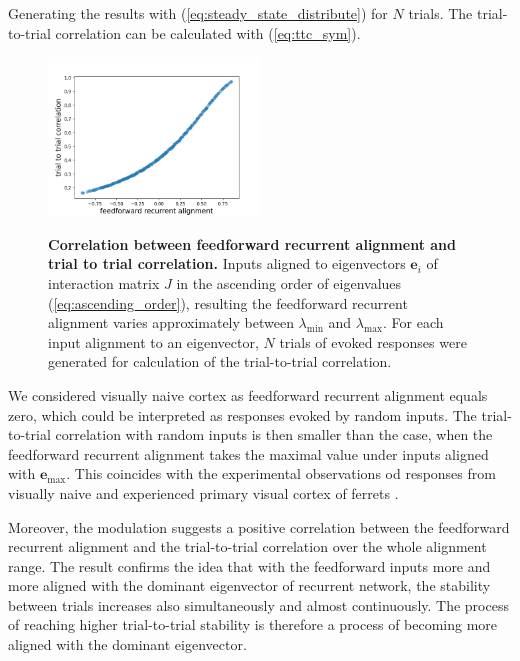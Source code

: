 \documentclass[11pt]{article}
\begin{document}
	Generating the results with (\ref{eq:steady_state_distribute}) for $N$ trials. The trial-to-trial correlation can be calculated with (\ref{eq:ttc_sym}). 
	\vspace{-0.4cm}
		\begin{figure} 
			\centering
			\caption{\textbf{Correlation between feedforward recurrent alignment and trial to trial correlation.} Inputs aligned to eigenvectors $\mathbf{e}_i$ of interaction matrix $J$ in the ascending order of eigenvalues (\ref{eq:ascending_order}), resulting the feedforward recurrent alignment varies approximately between $\lambda_{\text{min}}$ and $\lambda_{\text{max}}$. For each input alignment to an eigenvector, $N$ trials of evoked responses were generated for calculation of the trial-to-trial correlation.}
			\includegraphics[width=0.5\textwidth]{../figures/ttc_sym.png}
			\label{fig:ttc_ffrec_sym}
		\end{figure}
	
	We considered visually naive cortex as feedforward recurrent alignment equals zero, which could be interpreted as responses evoked by random inputs. The trial-to-trial correlation with random inputs is then smaller than the case, when the feedforward recurrent alignment takes the maximal value under inputs aligned with $\mathbf{e}_{\text{max}}$. This coincides with the experimental observations od responses from visually naive and experienced primary visual cortex of ferrets \cite{tragenap2023nature}. 
	
	Moreover, the modulation suggests a positive correlation between the feedforward recurrent alignment and the trial-to-trial correlation over the whole alignment range. The result confirms the idea that with the feedforward inputs more and more aligned with the dominant eigenvector of recurrent network, the stability between trials increases also simultaneously and almost continuously. The process of reaching higher trial-to-trial stability is therefore a process of becoming more aligned with the dominant eigenvector. 
	
\end{document}
